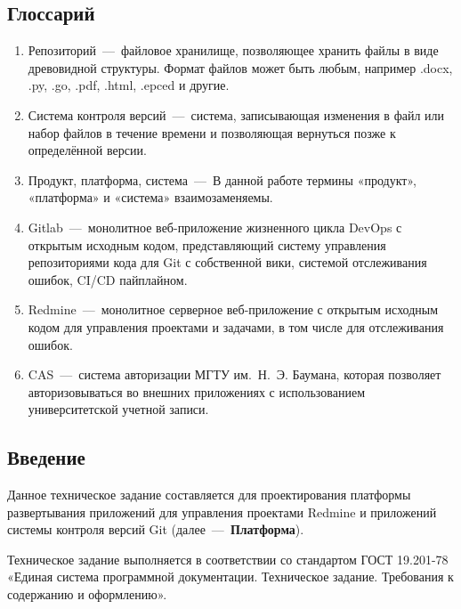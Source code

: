 \subsection*{Глоссарий}

\begin{enumerate}
	\item Репозиторий~---~файловое хранилище, позволяющее хранить файлы в виде древовидной структуры. Формат файлов может быть любым, например .docx, .py, .go, .pdf, .html, .epced и другие.
	\item Система контроля версий~---~система, записывающая изменения в файл или набор файлов в течение времени и позволяющая вернуться позже к определённой версии.
	\item Продукт, платформа, система~---~В данной работе термины «продукт», «платформа» и «система» взаимозаменяемы.
	\item Gitlab~---~монолитное веб-приложение жизненного цикла DevOps с открытым исходным кодом, представляющий систему управления репозиториями кода для Git с собственной вики, системой отслеживания ошибок, CI/CD пайплайном.
	\item Redmine~---~монолитное серверное веб-приложение с открытым исходным кодом для управления проектами и задачами, в том числе для отслеживания ошибок.
	\item CAS~---~система авторизации МГТУ им.~Н.~Э. Баумана, которая позволяет авторизовываться во внешних приложениях с использованием университетской учетной записи.
\end{enumerate}

\subsection*{Введение}

Данное техническое задание составляется для проектирования платформы развертывания приложений для управления проектами Redmine и приложений системы контроля версий Git (далее~---~\textbf{Платформа}).

 Техническое задание выполняется в соответствии со стандартом ГОСТ 19.201-78 «Единая система программной документации. Техническое задание. Требования к содержанию и оформлению».


